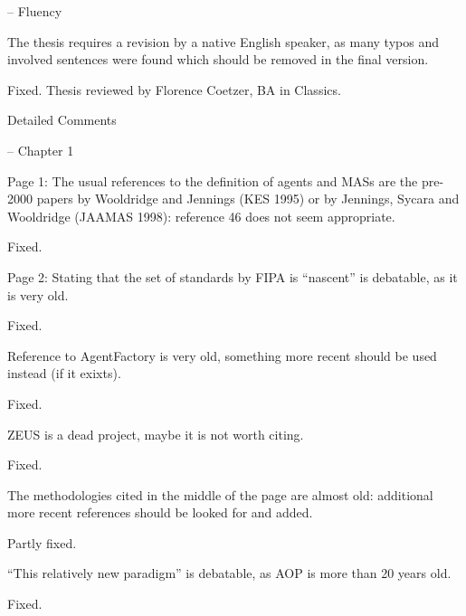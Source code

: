 \documentclass{article}
\newenvironment{them}{\noindent\begingroup\color{blue}}{\endgroup\par}
\begin{document}
\begin{them}

-- Fluency

The thesis requires a revision by a native English speaker, as many typos and
involved sentences were found which should be removed in the final version.

\end{them}
Fixed. Thesis reviewed by Florence Coetzer, BA in Classics.

\begin{them}

Detailed Comments

-- Chapter 1

Page 1:
The usual references to the definition of agents and MASs are the pre-2000
papers by Wooldridge and Jennings (KES 1995) or by Jennings, Sycara and
Wooldridge (JAAMAS 1998): reference 46 does not seem appropriate.

\end{them}
Fixed.

\begin{them}

Page 2:
Stating that the set of standards by FIPA is “nascent” is debatable, as it is
very old.

\end{them}
Fixed.

\begin{them}

Reference to AgentFactory is very old, something more recent should be used
instead (if it exixts).

\end{them}
Fixed.

\begin{them}

ZEUS is a dead project, maybe it is not worth citing.
\end{them}
Fixed.

\begin{them}

The methodologies cited in the middle of the page are almost old: additional
more recent references should be looked for and added.

\end{them}
Partly fixed.

\begin{them}

“This relatively new paradigm” is debatable, as AOP is more than 20 years old.
\end{them}
Fixed.
\end{document}
